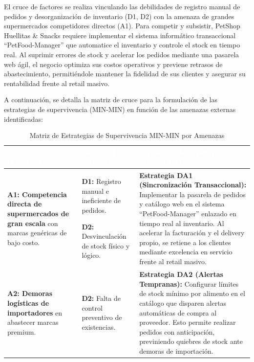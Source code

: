 El cruce de factores se realiza vinculando las debilidades de registro manual de pedidos y desorganización de inventario (D1, D2) con la amenaza de grandes supermercados competidores directos (A1). Para competir y subsistir, PetShop Huellitas \& Snacks requiere implementar el sistema informático transaccional ``PetFood-Manager'' que automatice el inventario y controle el stock en tiempo real. Al suprimir errores de stock y acelerar los pedidos mediante una pasarela web ágil, el negocio optimiza sus costos operativos y previene retrasos de abastecimiento, permitiéndole mantener la fidelidad de sus clientes y asegurar su rentabilidad frente al retail masivo.

A continuación, se detalla la matriz de cruce para la formulación de las estrategias de supervivencia (MIN-MIN) en función de las amenazas externas identificadas:

\begin{table}[H]
    \centering
    \small
    \renewcommand{\arraystretch}{1.4}
    \begin{tabularx}{\textwidth}{|L|p{4cm}|L|}
        \hline
        \textcolor{white}{\textbf{Amenaza (Entorno)}} & 
        \textcolor{white}{\textbf{Debilidad Interna}} & 
        \textcolor{white}{\textbf{Estrategia de Supervivencia (MIN-MIN)}} \\
        \hline
        \textbf{A1: Competencia directa de supermercados de gran escala} con marcas genéricas de bajo costo. & 
        \textbf{D1:} Registro manual e ineficiente de pedidos. \par
        \textbf{D2:} Desvinculación de stock físico y lógico. & 
        \textbf{Estrategia DA1 (Sincronización Transaccional):} Implementar la pasarela de pedidos y catálogo web en el sistema ``PetFood-Manager'' enlazado en tiempo real al inventario. Al acelerar la facturación y el delivery propio, se retiene a los clientes mediante excelencia en servicio frente al retail masivo. \\
        \hline
        \textbf{A2: Demoras logísticas de importadores} en abastecer marcas premium. & 
        \textbf{D2:} Falta de control preventivo de existencias. & 
        \textbf{Estrategia DA2 (Alertas Tempranas):} Configurar límites de stock mínimo por alimento en el catálogo que disparen alertas automáticas de compra al proveedor. Esto permite realizar pedidos con anticipación, previniendo quiebres de stock ante demoras de importación. \\
        \hline
    \end{tabularx}
    \caption{Matriz de Estrategias de Supervivencia MIN-MIN por Amenazas}
    \label{tab:estrategias_minmin}
\end{table}